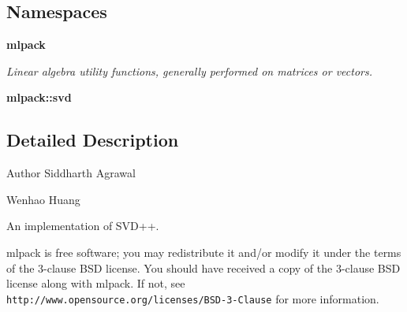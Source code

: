 \subsection*{Namespaces}
\begin{DoxyCompactItemize}
\item 
 \textbf{ mlpack}
\begin{DoxyCompactList}\small\item\em Linear algebra utility functions, generally performed on matrices or vectors. \end{DoxyCompactList}\item 
 \textbf{ mlpack\+::svd}
\end{DoxyCompactItemize}


\subsection{Detailed Description}
\begin{DoxyAuthor}{Author}
Siddharth Agrawal 

Wenhao Huang
\end{DoxyAuthor}
An implementation of S\+V\+D++.

mlpack is free software; you may redistribute it and/or modify it under the terms of the 3-\/clause B\+SD license. You should have received a copy of the 3-\/clause B\+SD license along with mlpack. If not, see {\tt http\+://www.\+opensource.\+org/licenses/\+B\+S\+D-\/3-\/\+Clause} for more information. 
